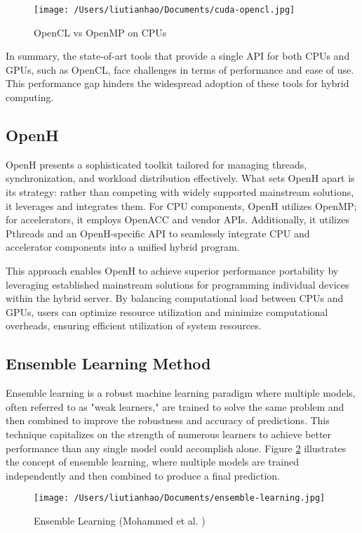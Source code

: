 \documentclass[13pt]{article}
\begin{document}
\begin{figure}[ht]
    \centering
    \texttt{[image: /Users/liutianhao/Documents/cuda-opencl.jpg]}
    \caption{OpenCL vs OpenMP on CPUs}
    \label{fig:opencl_openmp}
\end{figure}

In summary, the state-of-art tools that provide a single API for both CPUs and GPUs, such as OpenCL, face challenges in terms of performance and ease of use.
This performance gap hinders the widespread adoption of these tools for hybrid computing.


\subsection{OpenH}
OpenH presents a sophisticated toolkit tailored for managing threads, synchronization, and workload distribution effectively. What sets OpenH apart is its strategy: rather than competing with widely supported mainstream solutions, it leverages and integrates them. For CPU components, OpenH utilizes OpenMP; for accelerators, it employs OpenACC and vendor APIs. Additionally, it utilizes Pthreads and an OpenH-specific API to seamlessly integrate CPU and accelerator components into a unified hybrid program.

This approach enables OpenH to achieve superior performance portability by leveraging established mainstream solutions for programming individual devices within the hybrid server. By balancing computational load between CPUs and GPUs, users can optimize resource utilization and minimize computational overheads, ensuring efficient utilization of system resources.


\subsection{Ensemble Learning Method}
Ensemble learning is a robust machine learning paradigm where multiple models, often referred to as "weak learners," are trained to solve the same problem and then combined to improve the robustness and accuracy of predictions. 
This technique capitalizes on the strength of numerous learners to achieve better performance than any single model could accomplish alone. 
Figure \ref{fig:ensemble_learning} illustrates the concept of ensemble learning, where multiple models are trained independently and then combined to produce a final prediction.
\begin{figure}[ht]
    \centering
    \texttt{[image: /Users/liutianhao/Documents/ensemble-learning.jpg]}
    \caption{Ensemble Learning (Mohammed et al. \cite{ensemble_learning})}
    \label{fig:ensemble_learning}
\end{figure}
\end{document}
